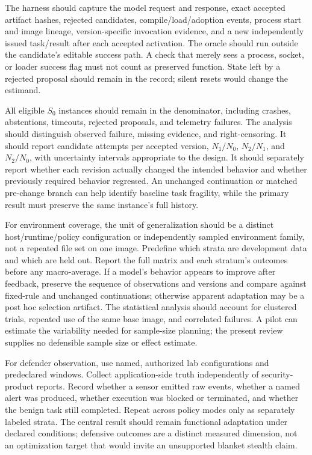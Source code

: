 \documentclass[11pt,letterpaper]{article}
\begin{document}
The harness should capture the model request and response, exact accepted artifact hashes, rejected candidates, compile/load/adoption events, process start and image lineage, version-specific invocation evidence, and a new independently issued task/result after each accepted activation. The oracle should run outside the candidate's editable success path. A check that merely sees a process, socket, or loader success flag must not count as preserved function. State left by a rejected proposal should remain in the record; silent resets would change the estimand.

All eligible $S_0$ instances should remain in the denominator, including crashes, abstentions, timeouts, rejected proposals, and telemetry failures. The analysis should distinguish observed failure, missing evidence, and right-censoring. It should report candidate attempts per accepted version, $N_1/N_0$, $N_2/N_1$, and $N_2/N_0$, with uncertainty intervals appropriate to the design. It should separately report whether each revision actually changed the intended behavior and whether previously required behavior regressed. An unchanged continuation or matched pre-change branch can help identify baseline task fragility, while the primary result must preserve the same instance's full history.

For environment coverage, the unit of generalization should be a distinct host/runtime/policy configuration or independently sampled environment family, not a repeated file set on one image. Predefine which strata are development data and which are held out. Report the full matrix and each stratum's outcomes before any macro-average. If a model's behavior appears to improve after feedback, preserve the sequence of observations and versions and compare against fixed-rule and unchanged continuations; otherwise apparent adaptation may be a post hoc selection artifact. The statistical analysis should account for clustered trials, repeated use of the same base image, and correlated failures. A pilot can estimate the variability needed for sample-size planning; the present review supplies no defensible sample size or effect estimate.

For defender observation, use named, authorized lab configurations and predeclared windows. Collect application-side truth independently of security-product reports. Record whether a sensor emitted raw events, whether a named alert was produced, whether execution was blocked or terminated, and whether the benign task still completed. Repeat across policy modes only as separately labeled strata. The central result should remain functional adaptation under declared conditions; defensive outcomes are a distinct measured dimension, not an optimization target that would invite an unsupported blanket stealth claim.
\end{document}
